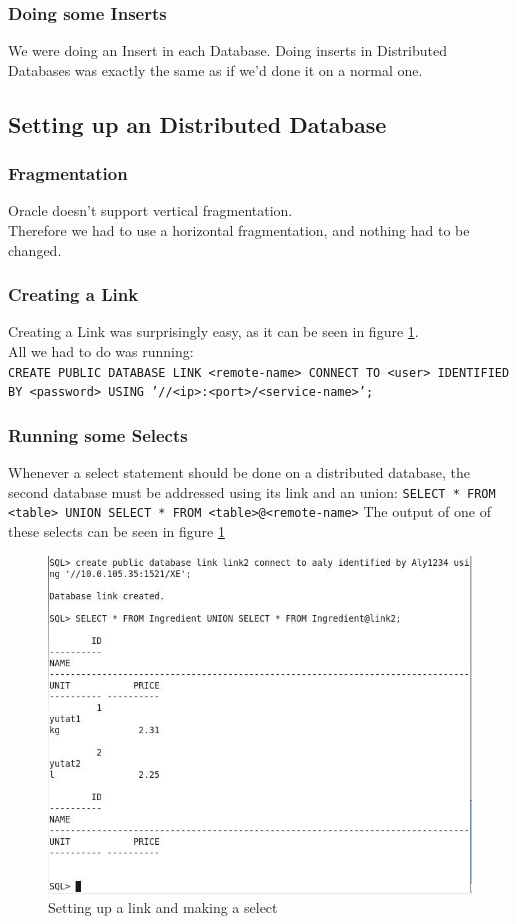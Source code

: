 \documentclass[12pt]{article}
\begin{document}
\subsubsection{Doing some Inserts}
We were doing an Insert in each Database. 
Doing inserts in Distributed Databases was exactly the same as if we'd done it on a normal one. 
\subsection{Setting up an Distributed Database}
\subsubsection{Fragmentation}
Oracle doesn't support vertical fragmentation. \\ Therefore we had to use a horizontal fragmentation, and nothing had to be changed.
\subsubsection{Creating a Link}
Creating a Link was surprisingly easy, as it can be seen in figure \ref{fig:endres}. \\
All we had to do was running: \\
\texttt{CREATE PUBLIC DATABASE LINK <remote-name> CONNECT TO <user> IDENTIFIED BY <password> USING '//<ip>:<port>/<service-name>';}
\subsubsection{Running some Selects}
Whenever a select statement should be done on a distributed database, the second database must be addressed using its link and an union:
\texttt{SELECT * FROM <table> UNION SELECT * FROM <table>@<remote-name>}
The output of one of these selects can be seen in figure \ref{fig:endres}

 \begin{figure}[here!]
	\centering
	\includegraphics[width=1.0\textwidth]{images/endres.jpg}
	\caption{Setting up a link and making a select}
	\label{fig:endres}
	\end{figure}	
	
\end{document}
